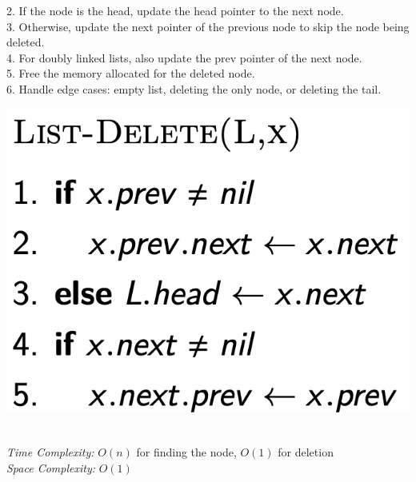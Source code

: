 \documentclass[5pt]{extarticle}
\begin{document}
\begin{minipage}[t]{0.49\textwidth}
{\begin{minipage}[htp]{0.9\textwidth}
\begin{minipage}[htp]{0.55\textwidth}
        2. If the node is the head, update the head pointer to the next node.\\
        3. Otherwise, update the next pointer of the previous node to skip the node being deleted.\\
        4. For doubly linked lists, also update the prev pointer of the next node.\\
        5. Free the memory allocated for the deleted node.\\
        6. Handle edge cases: empty list, deleting the only node, or deleting the tail.
    \end{minipage}
    \begin{minipage}[htp]{0.43\textwidth}
        \begin{center}
            \includegraphics[width=0.75\linewidth]{images/list-delete.png}
        \end{center}
    \end{minipage}\\
    \textit{Time Complexity:} \(O(n)\) for finding the node, \(O(1)\) for deletion \\ \textit{Space Complexity:} \(O(1)\)
\end{minipage}}
\end{minipage}
\hspace{-15px}
\end{document}
